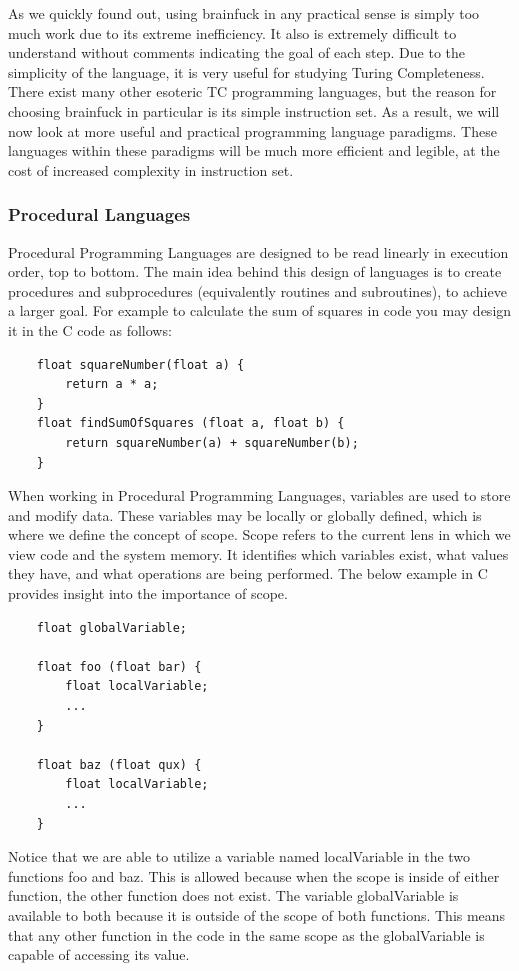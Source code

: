 As we quickly found out, using brainfuck in any practical sense is simply too much work due to its extreme inefficiency.
It also is extremely difficult to understand without comments indicating the goal of each step.
Due to the simplicity of the language, it is very useful for studying Turing Completeness.
There exist many other esoteric TC programming languages, but the reason for choosing brainfuck in particular is its simple instruction set.
As a result, we will now look at more useful and practical programming language paradigms.
These languages within these paradigms will be much more efficient and legible, at the cost of increased complexity in instruction set.

\subsubsection{Procedural Languages}\label{subsubsec:ProceduralPL}

Procedural Programming Languages are designed to be read linearly in execution order, top to bottom.
The main idea behind this design of languages is to create procedures and subprocedures (equivalently routines and subroutines), to achieve a larger goal.
For example to calculate the sum of squares in code you may design it in the C code as follows:

\begin{verbatim}
    float squareNumber(float a) {
        return a * a;
    }
    float findSumOfSquares (float a, float b) {
        return squareNumber(a) + squareNumber(b);
    }
\end{verbatim}
    
When working in Procedural Programming Languages, variables are used to store and modify data.
These variables may be locally or globally defined, which is where we define the concept of scope.
Scope refers to the current lens in which we view code and the system memory.
It identifies which variables exist, what values they have, and what operations are being performed.
The below example in C provides insight into the importance of scope.

\begin{verbatim}
    float globalVariable;

    float foo (float bar) {
        float localVariable;
        ...
    }

    float baz (float qux) {
        float localVariable;
        ...
    }
\end{verbatim}

Notice that we are able to utilize a variable named localVariable in the two functions foo and baz.
This is allowed because when the scope is inside of either function, the other function does not exist.
The variable globalVariable is available to both because it is outside of the scope of both functions.
This means that any other function in the code in the same scope as the globalVariable is capable of accessing its value.

